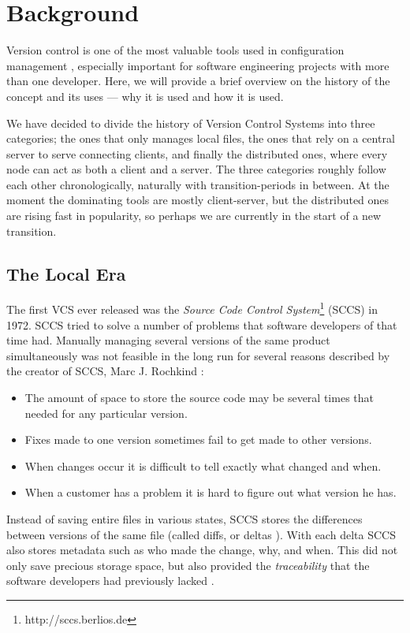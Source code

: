 \documentclass{llncs}
\begin{document}
\section{Background}
\label{sec:background}

Version control is one of the most valuable tools used in
configuration management \cite{ambriola90}, especially important for
software engineering projects with more than one developer. Here, we
will provide a brief overview on the history of the concept and its
uses --- why it is used and how it is used.

We have decided to divide the history of Version Control Systems into
three categories; the ones that only manages local files, the ones
that rely on a central server to serve connecting clients, and finally
the distributed ones, where every node can act as both a client and
a server. The three categories roughly follow each other
chronologically, naturally with transition-periods in between. At the
moment the dominating tools are mostly client-server, but the
distributed ones are rising fast in popularity, so perhaps we are
currently in the start of a new transition.

\subsection{The Local Era}
The first VCS ever released was the \emph{Source Code Control
  System}\footnote{ http://sccs.berlios.de } (SCCS) in 1972. SCCS tried
to solve a number of problems that software developers of that time
had. Manually managing several versions of the same product
simultaneously was not feasible in the long run for several reasons
described by the creator of SCCS, Marc J. Rochkind \cite{rochkind75}:

\begin{itemize}
 \item The amount of space to store the source code may be several
       times that needed for any particular version.
 \item Fixes made to one version sometimes fail to get made to
       other versions.
 \item When changes occur it is difficult to tell exactly what changed
       and when.
 \item When a customer has a problem it is hard to figure out what
       version he has.
\end{itemize}

Instead of saving entire files in various states, SCCS stores the
differences between versions of the same file (called diffs, or
deltas \cite{ambriola90}). With each delta SCCS also stores metadata
such as who made the change, why, and when. This did not only save
precious storage space, but also provided the \emph{traceability} that
the software developers had previously lacked \cite{rochkind75}.
\end{document}
